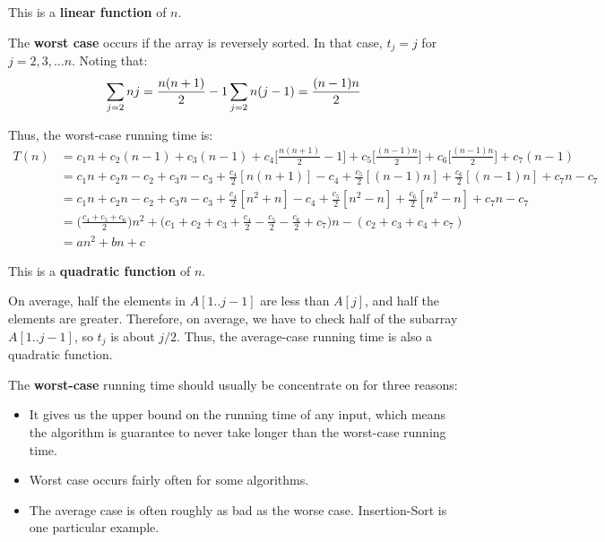       \par This is a \textbf{linear function} of $n$.
      \par The \textbf{worst case} occurs if the array is reversely sorted.
      In that case, $t_{j} = j$ for $j = 2, 3, \ldots n$. Noting that:
      \begin{align*}
        \sum\limits _{j = 2}{n} j = \frac{n(n + 1)}{2} - 1
        \sum\limits _{j = 2}{n} (j - 1) = \frac{(n - 1)n}{2}
      \end{align*}
      \par Thus, the worst-case running time is:
      \begin{align*}
        T(n) &= c_{1}n
          + c_{2}(n - 1)
          + c_{3}(n - 1)
          + c_{4} \bigg[ \frac{n(n + 1)}{2} - 1 \bigg]
          + c_{5} \bigg[ \frac{(n - 1)n}{2} \bigg]
          + c_{6} \bigg[ \frac{(n - 1)n}{2} \bigg]
          + c_{7}(n - 1) \\
          &= c_{1}n
          + c_{2}n - c_{2}
          + c_{3}n - c_{3}
          + \frac{c_{4}}{2} [n(n + 1)] - c_{4}
          + \frac{c_{5}}{2} [(n - 1)n]
          + \frac{c_{6}}{2} [(n - 1)n]
          + c_{7}n - c_{7} \\
          &= c_{1}n
          + c_{2}n - c_{2}
          + c_{3}n - c_{3}
          + \frac{c_{4}}{2} [n^{2} + n] - c_{4}
          + \frac{c_{5}}{2} [n^{2} - n]
          + \frac{c_{6}}{2} [n^{2} - n]
          + c_{7}n - c_{7} \\
          &= \bigg(\frac{c_{4} + c_{5} + c_{6}}{2} \bigg) n^{2}
          + \bigg(c_{1} + c_{2} + c_{3}
            + \frac{c_{4}}{2} - \frac{c_{5}}{2} - \frac{c_{6}}{2} + c_{7} \bigg) n
          - (c_{2} + c_{3} + c_{4} + c_{7}) \\
          &= an^{2} + bn + c
      \end{align*}
      \par This is a \textbf{quadratic function} of $n$.
      \par On average, half the elements in $A[1..j - 1]$ are less than $A[j]$, and half the
      elements are greater. Therefore, on average, we have to check half of the subarray
      $A[1..j - 1]$, so $t_{j}$ is about $j/2$. Thus, the average-case running time is
      also a quadratic function.

  
    \par The \textbf{worst-case} running time should usually be concentrate on for three
    reasons:
    \begin{itemize}
      \item It gives us the upper bound on the running time of any input, which means the
        algorithm is guarantee to never take longer than the worst-case running time.
      \item Worst case occurs fairly often for some algorithms.
      \item The average case is often roughly as bad as the worse case. Insertion-Sort is
        one particular example.
    \end{itemize}


